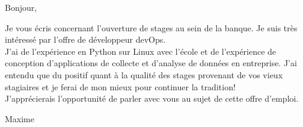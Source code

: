 \documentclass[12pt,french]{letter}
\begin{document}

\begin{letter}{}
\address{Montréal, Canada}

\opening{Bonjour,}


Je vous écris concernant l'ouverture de stages au sein de la banque. Je suis très intéressé par l'offre de développeur devOps. \\
J'ai de l'expérience en Python sur Linux avec l'école et de l'expérience de conception d'applications de collecte et d'analyse de données en entreprise. J'ai entendu que du positif quant à la qualité des stages provenant de vos vieux stagiaires et je ferai de mon mieux pour continuer la tradition!
\\J'apprécierais l'opportunité de parler avec vous au sujet de cette offre d'emploi.

\closing{Maxime}


\end{letter}
\end{document}
